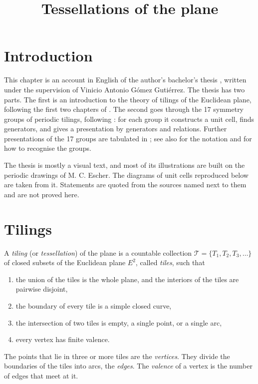 



\title{Tessellations of the plane}
\maketitle

\label{section-phantom}

\tableofcontents

\section{Introduction}
\label{section-introduction}

\noindent
This chapter is an account in English of the
author's bachelor's thesis
\cite{gca-tesis-licenciatura}, written under
the supervision of Vinicio Antonio G\'omez
Guti\'errez. The thesis has two parts. The
first is an introduction to the theory of
tilings of the Euclidean plane, following the
first two chapters of
\cite{GrunbaumShephard1987}. The second goes
through the 17 symmetry groups of periodic
tilings, following
\cite{Martin1982}: for each group it
constructs a unit cell, finds generators, and
gives a presentation by generators and
relations. Further presentations of the 17
groups are tabulated in
\cite{CoxeterMoser1957}; see also
\cite{Schattschneider1978} for the notation
and for how to recognise the groups.

The thesis is mostly a visual text, and most
of its illustrations are built on the periodic
drawings of M. C. Escher. The diagrams of unit
cells reproduced below are taken from it.
Statements are quoted from the sources named
next to them and are not proved here.

\section{Tilings}
\label{section-tilings}

\begin{definition}
\label{definition-tiling}
A \emph{tiling} (or \emph{tessellation}) of
the plane is a countable collection
$\mathcal{T}=\{T_1,T_2,T_3,\ldots\}$ of closed
subsets of the Euclidean plane $E^2$, called
\emph{tiles}, such that
\begin{enumerate}
\item the union of the tiles is the whole
plane, and the interiors of the tiles are
pairwise disjoint,
\item the boundary of every tile is a simple
closed curve,
\item the intersection of two tiles is empty,
a single point, or a single arc,
\item every vertex has finite valence.
\end{enumerate}
The points that lie in three or more tiles are
the \emph{vertices}. They divide the
boundaries of the tiles into arcs, the
\emph{edges}. The \emph{valence} of a vertex
is the number of edges that meet at it.
\end{definition}


